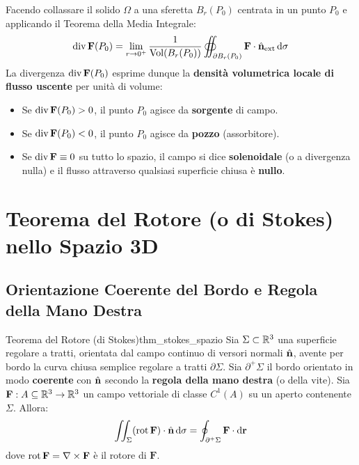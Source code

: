 \begin{osservazione}
Facendo collassare il solido $\Omega$ a una sferetta $B_r(P_0)$ centrata in un punto $P_0$ e applicando il Teorema della Media Integrale:
\[
\operatorname{div} \mathbf{F}(P_0) = \lim_{r \to 0^+} \frac{1}{\operatorname{Vol}(B_r(P_0))} \oiint_{\partial B_r(P_0)} \mathbf{F} \cdot \hat{\mathbf{n}}_{\text{ext}} \mathop{}\!\mathrm{d}\sigma
\]
La divergenza $\operatorname{div} \mathbf{F}(P_0)$ esprime dunque la \textbf{densità volumetrica locale di flusso uscente} per unità di volume:
\begin{itemize}
    \item Se $\operatorname{div} \mathbf{F}(P_0) > 0$, il punto $P_0$ agisce da \textbf{sorgente} di campo.
    \item Se $\operatorname{div} \mathbf{F}(P_0) < 0$, il punto $P_0$ agisce da \textbf{pozzo} (assorbitore).
    \item Se $\operatorname{div} \mathbf{F} \equiv 0$ su tutto lo spazio, il campo si dice \textbf{solenoidale} (o a divergenza nulla) e il flusso attraverso qualsiasi superficie chiusa è \textbf{nullo}.
\end{itemize}
\end{osservazione}

\section{Teorema del Rotore (o di Stokes) nello Spazio 3D}

\subsection{Orientazione Coerente del Bordo e Regola della Mano Destra}

\begin{teorema}{Teorema del Rotore (di Stokes)}{thm_stokes_spazio}
Sia $\Sigma \subset \mathbb{R}^3$ una superficie regolare a tratti, orientata dal campo continuo di versori normali $\hat{\mathbf{n}}$, avente per bordo la curva chiusa semplice regolare a tratti $\partial \Sigma$.
Sia $\partial^+ \Sigma$ il bordo orientato in modo \textbf{coerente} con $\hat{\mathbf{n}}$ secondo la \textbf{regola della mano destra} (o della vite).
Sia $\mathbf{F}: A \subseteq \mathbb{R}^3 \to \mathbb{R}^3$ un campo vettoriale di classe $C^1(A)$ su un aperto contenente $\Sigma$. Allora:
\[
\iint_\Sigma (\operatorname{rot} \mathbf{F}) \cdot \hat{\mathbf{n}} \mathop{}\!\mathrm{d}\sigma = \oint_{\partial^+ \Sigma} \mathbf{F} \cdot \mathop{}\!\mathrm{d}\mathbf{r}
\]
dove $\operatorname{rot} \mathbf{F} = \nabla \times \mathbf{F}$ è il rotore di $\mathbf{F}$.
\end{teorema}

